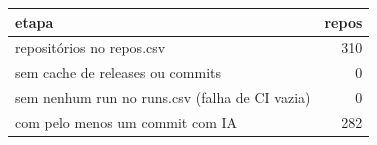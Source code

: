 \begin{tabular}{lr}
\toprule
etapa & repos \\
\midrule
repositórios no repos.csv & 310 \\
sem cache de releases ou commits & 0 \\
sem nenhum run no runs.csv (falha de CI vazia) & 0 \\
com pelo menos um commit com IA & 282 \\
\bottomrule
\end{tabular}
